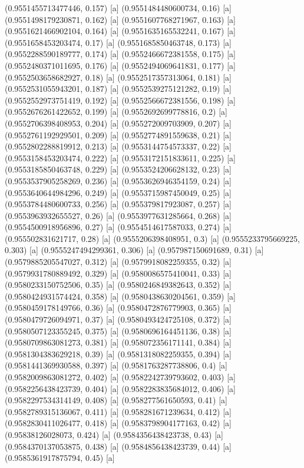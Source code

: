 {{{(0.9551455713477446, 0.157) [a] 
(0.9551484480600734, 0.16) [a] 
(0.9551498179230871, 0.162) [a] 
(0.9551607768271967, 0.163) [a] 
(0.9551621466902104, 0.164) [a] 
(0.9551635165532241, 0.167) [a] 
(0.9551658453203474, 0.17) [a] 
(0.9551685850463748, 0.173) [a] 
(0.9552288590189777, 0.174) [a] 
(0.9552466672381558, 0.175) [a] 
(0.9552480371011695, 0.176) [a] 
(0.9552494069641831, 0.177) [a] 
(0.9552503658682927, 0.18) [a] 
(0.9552517357313064, 0.181) [a] 
(0.9552531055943201, 0.187) [a] 
(0.9552539275121282, 0.19) [a] 
(0.9552552973751419, 0.192) [a] 
(0.9552566672381556, 0.198) [a] 
(0.9552676261422652, 0.199) [a] 
(0.9552692699778816, 0.2) [a] 
(0.9552706398408953, 0.204) [a] 
(0.955272009703909, 0.207) [a] 
(0.9552761192929501, 0.209) [a] 
(0.9552774891559638, 0.21) [a] 
(0.9552802288819912, 0.213) [a] 
(0.9553144754573337, 0.22) [a] 
(0.9553158453203474, 0.222) [a] 
(0.9553172151833611, 0.225) [a] 
(0.9553185850463748, 0.229) [a] 
(0.9553524206628132, 0.23) [a] 
(0.9553537905258269, 0.236) [a] 
(0.9553626946354159, 0.24) [a] 
(0.9553640644984296, 0.249) [a] 
(0.9553715987450049, 0.25) [a] 
(0.9553784480600733, 0.256) [a] 
(0.955379817923087, 0.257) [a] 
(0.9553963932655527, 0.26) [a] 
(0.9553977631285664, 0.268) [a] 
(0.9554500918956896, 0.27) [a] 
(0.9554514617587033, 0.274) [a] 
(0.955502831621717, 0.28) [a] 
(0.9555206398408951, 0.3) [a] 
(0.9555233795669225, 0.303) [a] 
(0.9555247494299361, 0.306) [a] 
(0.957987150691689, 0.31) [a] 
(0.9579885205547027, 0.312) [a] 
(0.9579918082259355, 0.32) [a] 
(0.9579931780889492, 0.329) [a] 
(0.9580086575410041, 0.33) [a] 
(0.9580233150752506, 0.35) [a] 
(0.9580246849382643, 0.352) [a] 
(0.9580424931574424, 0.358) [a] 
(0.9580438630204561, 0.359) [a] 
(0.9580459178149766, 0.36) [a] 
(0.9580472876779903, 0.365) [a] 
(0.9580479726094971, 0.37) [a] 
(0.9580493424725108, 0.372) [a] 
(0.9580507123355245, 0.375) [a] 
(0.9580696164451136, 0.38) [a] 
(0.9580709863081273, 0.381) [a] 
(0.958072356171141, 0.384) [a] 
(0.9581304383629218, 0.39) [a] 
(0.9581318082259355, 0.394) [a] 
(0.9581441369930588, 0.397) [a] 
(0.9581763287738806, 0.4) [a] 
(0.9582009863081272, 0.402) [a] 
(0.9582242739793602, 0.403) [a] 
(0.9582256438423739, 0.404) [a] 
(0.9582283835684012, 0.406) [a] 
(0.9582297534314149, 0.408) [a] 
(0.958277561650593, 0.41) [a] 
(0.9582789315136067, 0.411) [a] 
(0.958281671239634, 0.412) [a] 
(0.9582830411026477, 0.418) [a] 
(0.9583798904177163, 0.42) [a] 
(0.95838126028073, 0.424) [a] 
(0.9584356438423738, 0.43) [a] 
(0.9584370137053875, 0.438) [a] 
(0.9584856438423739, 0.44) [a] 
(0.9585361917875794, 0.45) [a] 
}}}
